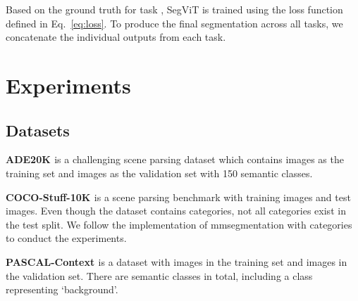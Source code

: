 Based on the ground truth  for task , SegViT is trained using the loss function defined in Eq.~\ref{eq:loss}. To produce the final segmentation across all tasks, we concatenate the individual outputs  from each task. 
















 \section{Experiments}
\label{sec:exp}
\subsection{Datasets}
\textbf{ADE20K \cite{ade20k}}  
is a challenging scene parsing dataset which contains  images  as the training set and  images as the validation set with 150 semantic classes. 

\noindent\textbf{COCO-Stuff-10K \cite{cocostuff}}
is a scene parsing benchmark with  training images and  test images. Even though the dataset contains  categories, not all categories exist in the test split. We follow the implementation of mmsegmentation \cite{mmseg} with  categories to conduct the experiments.

\noindent\textbf{PASCAL-Context \cite{pascal_context}}
is a dataset with  images in the training set and  images in the validation set. There are  semantic classes in total, including a class representing `background'. 

